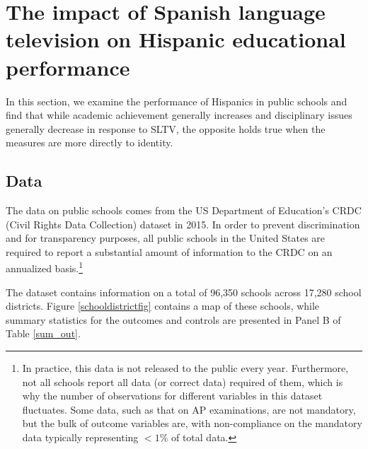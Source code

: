 \documentclass[11pt]{article}
\begin{document}


\section{The impact of Spanish language television on Hispanic educational performance}\label{secschool}

In this section, we examine the performance of Hispanics in public schools and find that while academic achievement generally increases and disciplinary issues generally decrease in response to SLTV, the opposite holds true when the measures are more directly to identity. 

\subsection{Data}

The data on public schools comes from the US Department of Education's CRDC (Civil Rights Data Collection) dataset in 2015. In order to prevent discrimination and for transparency purposes, all public schools in the United States are required to report a substantial amount of information to the CRDC on an annualized basis.\footnote{ In practice, this data is not released to the public every year. Furthermore, not all schools report all data (or correct data) required of them, which is why the number of observations for different variables in this dataset fluctuates. Some data, such as that on AP examinations, are not mandatory, but the bulk of outcome variables are, with non-compliance on the mandatory data typically representing $<1\%$ of total data.} 

The dataset contains information on a total of 96,350 schools across 17,280 school districts. Figure \ref{schooldistrictfig} contains a map of these schools, while summary statistics for the outcomes and controls are presented in Panel B of Table \ref{sum_out}.
\end{document}
